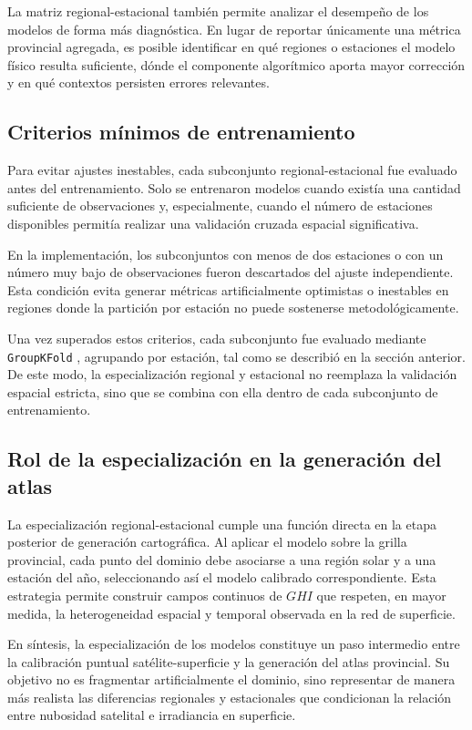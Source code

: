 \documentclass[../main.tex]{subfiles}
\begin{document}
La matriz regional-estacional también permite analizar el desempeño de los modelos de forma más diagnóstica. En lugar de reportar únicamente una métrica provincial agregada, es posible identificar en qué regiones o estaciones el modelo físico resulta suficiente, dónde el componente algorítmico aporta mayor corrección y en qué contextos persisten errores relevantes.

\subsection{Criterios mínimos de entrenamiento}

Para evitar ajustes inestables, cada subconjunto regional-estacional fue evaluado antes del entrenamiento. Solo se entrenaron modelos cuando existía una cantidad suficiente de observaciones y, especialmente, cuando el número de estaciones disponibles permitía realizar una validación cruzada espacial significativa.

En la implementación, los subconjuntos con menos de dos estaciones o con un número muy bajo de observaciones fueron descartados del ajuste independiente. Esta condición evita generar métricas artificialmente optimistas o inestables en regiones donde la partición por estación no puede sostenerse metodológicamente.

Una vez superados estos criterios, cada subconjunto fue evaluado mediante \texttt{GroupKFold} \cite{scikit-learn}, agrupando por estación, tal como se describió en la sección anterior. De este modo, la especialización regional y estacional no reemplaza la validación espacial estricta, sino que se combina con ella dentro de cada subconjunto de entrenamiento.

\subsection{Rol de la especialización en la generación del atlas}

La especialización regional-estacional cumple una función directa en la etapa posterior de generación cartográfica. Al aplicar el modelo sobre la grilla provincial, cada punto del dominio debe asociarse a una región solar y a una estación del año, seleccionando así el modelo calibrado correspondiente. Esta estrategia permite construir campos continuos de $GHI$ que respeten, en mayor medida, la heterogeneidad espacial y temporal observada en la red de superficie.

En síntesis, la especialización de los modelos constituye un paso intermedio entre la calibración puntual satélite-superficie y la generación del atlas provincial. Su objetivo no es fragmentar artificialmente el dominio, sino representar de manera más realista las diferencias regionales y estacionales que condicionan la relación entre nubosidad satelital e irradiancia en superficie.
\end{document}
